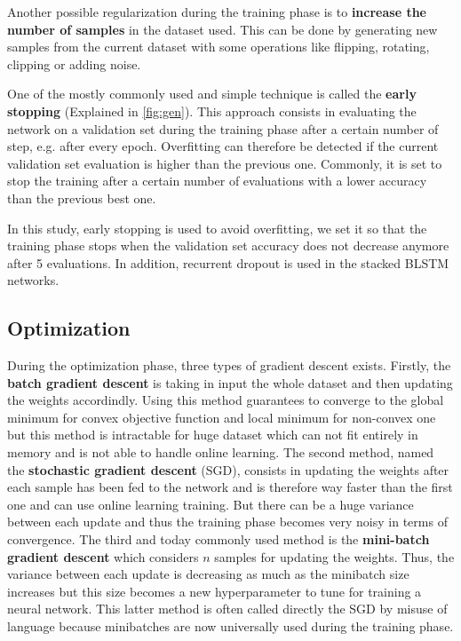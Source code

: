 \documentclass[master, tikz, final,11pt, dvipdfmx]{iscs-thesis}
\begin{document}
Another possible regularization during the training phase is to \textbf{increase the number of samples} in the dataset used. This can be done by generating new samples from the current dataset with some operations like flipping, rotating, clipping or adding noise.

One of the mostly commonly used and simple technique is called the \textbf{early stopping} (Explained in \autoref{fig:gen}). This approach consists in evaluating the network on a validation set during the training phase after a certain number of step, e.g. after every epoch. Overfitting can therefore be detected if the current validation set evaluation is higher than the previous one. Commonly, it is set to stop the training after a certain number of evaluations with a lower accuracy than the previous best one. 

In this study, early stopping is used to avoid overfitting, we set it so that the training phase stops when the validation set accuracy does not decrease anymore after 5 evaluations. In addition, recurrent dropout is used in the stacked BLSTM networks.

\subsection{Optimization}

During the optimization phase, three types of gradient descent exists. Firstly, the \textbf{batch gradient descent} is taking in input the whole dataset and then updating the weights accordindly. Using this method guarantees to converge to the global minimum for convex objective function and local minimum for non-convex one but this method is intractable for huge dataset which can not fit entirely in memory and is not able to handle online learning. The second method, named the \textbf{stochastic gradient descent} (SGD), consists in updating the weights after each sample has been fed to the network and is therefore way faster than the first one and can use online learning training. But there can be a huge variance between each update and thus the training phase becomes very noisy in terms of convergence. The third and today commonly used method is the \textbf{mini-batch gradient descent} which considers $n$ samples for updating the weights. Thus, the variance between each update is decreasing as much as the minibatch size increases but this size becomes a new hyperparameter to tune for training a neural network. This latter method is often called directly the SGD by misuse of language because minibatches are now universally used during the training phase.
\end{document}
